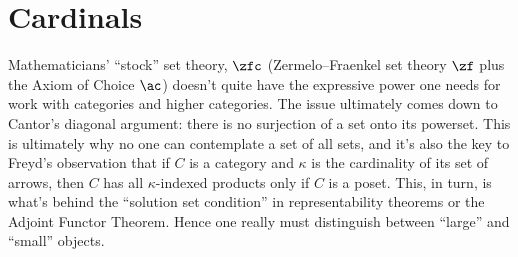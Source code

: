 
\section{Cardinals}%
\label{sec:cardinals}

Mathematicians' \enquote{stock} set theory, $\zfc$
(Zermelo--Fraenkel set theory $\zf$ plus the Axiom of Choice $\ac$)
doesn't quite have the expressive power one needs for work with categories and higher categories.
The issue ultimately comes down to Cantor's diagonal argument:
there is no surjection of a set onto its powerset.
This is ultimately why no one can contemplate a set of all sets,
and it's also the key to Freyd's observation that
if $C$ is a category and $\kappa$ is the cardinality of its set of arrows,
then $C$ has all $\kappa$-indexed products only if $C$ is a poset.
This, in turn, is what's behind the \enquote{solution set condition}
in representability theorems or the Adjoint Functor Theorem.
Hence one really must distinguish between \enquote{large} and \enquote{small} objects.

